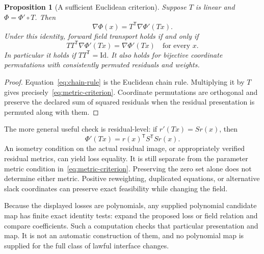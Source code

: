\documentclass[11pt]{article}
\newcommand{\Id}{\mathrm{Id}}
\newtheorem{proposition}[theorem]{Proposition}
\theoremstyle{remark}
\begin{document}
\begin{proposition}[A sufficient Euclidean criterion]\label{prop:metric}
Suppose $T$ is linear and $\Phi=\Phi'\circ T$. Then
\begin{equation}\label{eq:chain-rule}
 \nabla\Phi(x)=T^{\mathsf T}\nabla\Phi'(Tx).
\end{equation}
Under this identity, forward field transport holds if and only if
\begin{equation}\label{eq:metric-criterion}
 TT^{\mathsf T}\nabla\Phi'(Tx)=\nabla\Phi'(Tx)
 \quad\text{for every }x.
\end{equation}
In particular it holds if $TT^{\mathsf T}=\Id$. It also holds for bijective coordinate permutations with consistently permuted residuals and weights.
\end{proposition}
\begin{proof}
Equation~\eqref{eq:chain-rule} is the Euclidean chain rule. Multiplying it by $T$ gives precisely~\eqref{eq:metric-criterion}. Coordinate permutations are orthogonal and preserve the declared sum of squared residuals when the residual presentation is permuted along with them.
\end{proof}

The more general useful check is residual-level: if $r'(Tx)=Sr(x)$, then
\[
 \Phi'(Tx)=r(x)^{\mathsf T}S^{\mathsf T}S r(x).
\]
An isometry condition on the actual residual image, or appropriately verified residual metrics, can yield loss equality. It is still separate from the parameter metric condition in~\eqref{eq:metric-criterion}. Preserving the zero set alone does not determine either metric. Positive reweighting, duplicated equations, or alternative slack coordinates can preserve exact feasibility while changing the field.

Because the displayed losses are polynomials, any supplied polynomial candidate map has finite exact identity tests: expand the proposed loss or field relation and compare coefficients. Such a computation checks that particular presentation and map. It is not an automatic construction of them, and no polynomial map is supplied for the full class of lawful interface changes.
\end{document}
